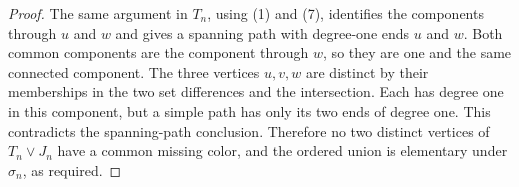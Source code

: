 \begin{proof}
The same argument in $T_n$, using (1) and (7), identifies the components
through $u$ and $w$ and gives a spanning path with degree-one ends $u$
and $w$.  Both common components are the component through $w$, so they
are one and the same connected component.  The three vertices $u,v,w$
are distinct by their memberships in the two set differences and the
intersection.  Each has degree one in this component, but a simple path
has only its two ends of degree one.  This contradicts the spanning-path
conclusion.  Therefore no two distinct vertices of $T_n\vee J_n$ have a
common missing color, and the ordered union is elementary under
$\sigma_n$, as required.
\end{proof}
